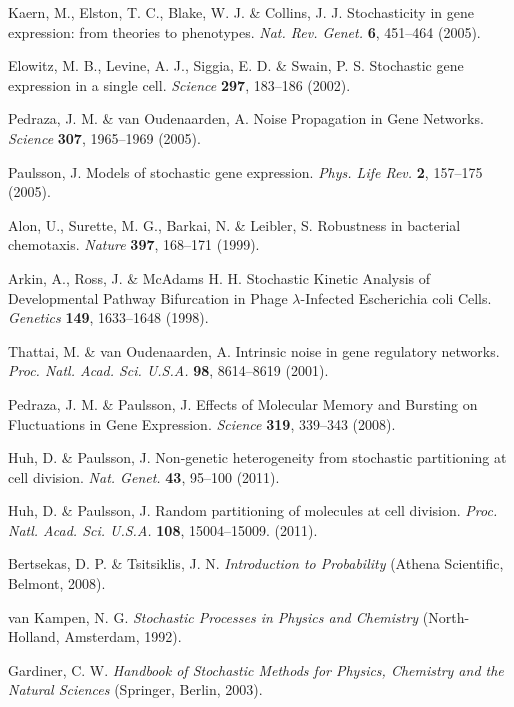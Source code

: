 \documentclass[12pt]{article}
\begin{document}
\begin{thebibliography}{10}

 Kaern, M., Elston, T. C., Blake, W. J. \& Collins, J. J. Stochasticity in gene expression: from theories to phenotypes. \textit{Nat. Rev. Genet.} \textbf{6}, 451--464 (2005).

 Elowitz, M. B., Levine, A. J., Siggia, E. D. \& Swain, P. S. Stochastic gene expression in a single cell. \textit{Science} \textbf{297}, 183--186 (2002).

 Pedraza, J. M. \& van Oudenaarden, A. Noise Propagation in Gene Networks. \textit{Science} \textbf{307}, 1965--1969 (2005).

 Paulsson, J. Models of stochastic gene expression. \textit{Phys. Life Rev.} \textbf{2}, 157--175 (2005).

 Alon, U., Surette, M. G., Barkai, N. \& Leibler, S. Robustness in bacterial chemotaxis. \textit{Nature} \textbf{397}, 168--171 (1999).

 Arkin, A., Ross, J. \& McAdams H. H. Stochastic Kinetic Analysis of Developmental Pathway Bifurcation in Phage $\lambda$-Infected Escherichia coli Cells. \textit{Genetics} \textbf{149}, 1633--1648 (1998).

 Thattai, M. \& van Oudenaarden, A. Intrinsic noise in gene regulatory networks. \textit{Proc. Natl. Acad. Sci. U.S.A.} \textbf{98}, 8614--8619 (2001).

 Pedraza, J. M. \& Paulsson, J. Effects of Molecular Memory and Bursting on Fluctuations in Gene Expression. \textit{Science} \textbf{319}, 339--343 (2008).

 Huh, D. \& Paulsson, J. Non-genetic heterogeneity from stochastic partitioning at cell division. \textit{Nat. Genet.} \textbf{43}, 95--100 (2011).

 Huh, D. \& Paulsson, J. Random partitioning of molecules at cell division. \textit{Proc. Natl. Acad. Sci. U.S.A.} \textbf{108}, 15004--15009. (2011).

 Bertsekas, D. P. \& Tsitsiklis, J. N. \textit{Introduction to Probability} (Athena Scientific, Belmont, 2008).

 van Kampen, N. G. \textit{Stochastic Processes in Physics and Chemistry} (North-Holland, Amsterdam, 1992).

 Gardiner, C. W. \textit{Handbook of Stochastic Methods for Physics, Chemistry and the Natural Sciences} (Springer, Berlin, 2003).


\end{thebibliography}
\end{document}
